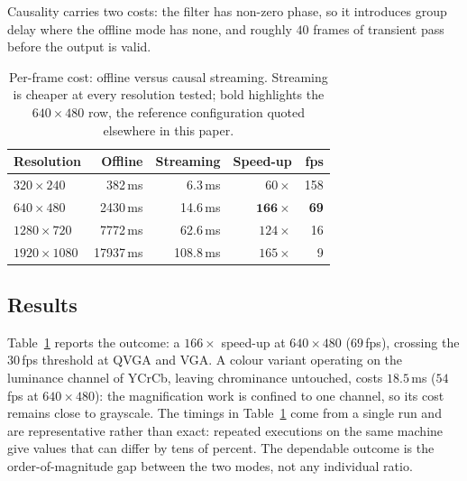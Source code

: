 \documentclass[conference]{IEEEtran}
\begin{document}
Causality carries two costs: the filter has non-zero phase, so it introduces
group delay where the offline mode has none, and roughly $40$ frames of
transient pass before the output is valid.

\begin{table}[t]
\caption{Per-frame cost: offline versus causal streaming. Streaming is
cheaper at every resolution tested; bold highlights the $640\times480$ row,
the reference configuration quoted elsewhere in this paper.}
\label{tab:speed}
\centering
\begin{tabular}{lrrrr}
\toprule
Resolution & Offline & Streaming & Speed-up & fps \\
\midrule
$320\times240$   & 382\,ms   & 6.3\,ms   & $60\times$  & 158 \\
$640\times480$   & 2430\,ms  & 14.6\,ms  & $\mathbf{166\times}$ & \textbf{69} \\
$1280\times720$  & 7772\,ms  & 62.6\,ms  & $124\times$ & 16 \\
$1920\times1080$ & 17937\,ms & 108.8\,ms & $165\times$ & 9 \\
\bottomrule
\end{tabular}
\end{table}

\subsection{Results}

Table~\ref{tab:speed} reports the outcome: a $166\times$ speed-up at
$640\times480$ ($69$\,fps), crossing the $30$\,fps threshold at QVGA and VGA. A
colour variant operating on the luminance channel of YCrCb, leaving chrominance
untouched, costs $18.5$\,ms ($54$\,fps at $640\times480$): the magnification
work is confined to one channel, so its cost remains close to grayscale.
The timings in Table~\ref{tab:speed} come from a single run and are
representative rather than exact: repeated executions on the same machine give
values that can differ by tens of percent. The dependable outcome is the
order-of-magnitude gap between the two modes, not any individual ratio.
\end{document}
